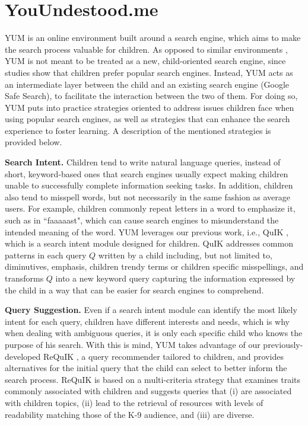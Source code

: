 \documentclass{sig-alternate-05-2015}
\begin{document}
\section{YouUndestood.me}
\label{sec:method}
YUM is an online environment built around a search engine, which aims to make the search process valuable for children. As opposed to similar environments \cite{Ust14}, YUM is not meant to be treated as a new, child-oriented search engine, since studies \cite{Bil13} show that children prefer popular search engines. Instead, YUM acts as an intermediate layer between the child and an existing search engine (Google Safe Search), to facilitate the interaction between the two of them. For doing so, YUM puts into practice strategies oriented to address issues children face when using popular search engines, as well as strategies that can enhance the search experience to foster learning.  A description of the mentioned strategies is provided below.

\noindent
\textbf{Search Intent.} Children tend to write natural language queries, instead of short, keyword-based ones that search engines usually expect \cite{Rie16} making children unable to successfully complete information seeking tasks. In addition, children also tend to misspell words, but not necessarily in the same fashion as average users. For example, children commonly repeat letters in a word to emphasize it, such as in ``faaaaast", which can cause search engines to misunderstand the intended meaning of the word. YUM leverages our previous work, i.e., QuIK \cite{Quik}, which is a search intent module designed  for children. QuIK addresses common patterns in each query $Q$ written by a child including, but not limited to, diminutives, emphasis, children trendy terms or children specific misspellings, and transforms $Q$ into a new keyword query capturing the information expressed by the child in a way that can be easier for search engines to comprehend.

\noindent
\textbf{Query Suggestion.} Even if a search intent module can identify the most likely intent for each query, children have different interests and needs, which is why when dealing with ambiguous queries, it is only each specific child who knows the purpose of his search. With this is mind,  YUM takes advantage of our previously-developed ReQuIK \cite{Requik}, a query recommender tailored to children, and provides alternatives for the initial query that the child can select to better inform the search process. ReQuIK is based on a multi-criteria strategy that examines  traits commonly associated with children and suggests queries that (i) are associated with children topics, (ii) lead to the retrieval of resources with levels of readability matching those of the K-9 audience, and (iii) are diverse.
\end{document}
